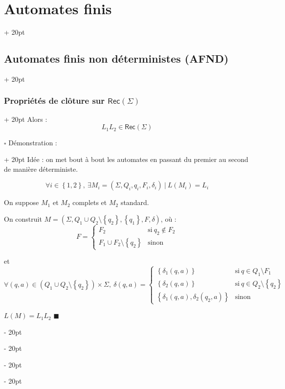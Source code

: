 \documentclass[a4paper, 12pt, twoside]{article}
\newcommand{\lr}[1]{\left( #1 \right)}
\newcommand{\set}[1]{\left\{ #1 \right\}}
\newcommand{\ind}[1][20pt]{\advance\leftskip + #1}
\newcommand{\deind}[1][20pt]{\advance\leftskip - #1}
\newenvironment{indt}[2][20pt]{#2 \par \ind[#1]}{\par \deind} %
\newenvironment{proof}[1][{Démonstration :}]{\begin{indt}{$\square$ #1}}{$\blacksquare$ \end{indt}}
\newcommand{\Rec}[1]{\mathsf{Rec}\!\lr{#1}}
\begin{document}
\begin{indt}{\section{Automates finis}}
\begin{indt}{\subsection{Automates finis non déterministes (AFND)}}
\begin{indt}{\subsubsection{Propriétés de clôture sur $\Rec \Sigma$}}
                Alors :
                \[
                    L_1 L_2 \in \Rec \Sigma
                \]

                \begin{proof}
                    Idée : on met bout à bout les automates en passant du premier au second de manière déterministe.

                    \[
                        \forall i \in \set{1, 2},\ \exists M_i = (\Sigma, Q_i, q_i, F_i, \delta_i)\ |\ L(M_i) = L_i
                    \]

                    On suppose $M_1$ et $M_2$ complets et $M_2$ standard.

                    On construit $M = \lr{\Sigma, Q_1 \cup Q_2 \setminus \set{q_2}, \set{q_1}, F, \delta}$, où :
                    \[
                        F =
                        \begin{cases}
                            F_2
                            & \text{si}\ q_2 \notin F_2
                            \\
                            F_1 \cup F_2 \setminus \set{q_2}
                            & \text{sinon}
                        \end{cases}
                    \]

                    et
                    \[
                        \forall (q, a) \in \lr{Q_1 \cup Q_2 \setminus \set{q_2}} \times \Sigma,\
                        \delta(q, a) =
                        \begin{cases}
                            \set{\delta_1(q, a)}
                            & \text{si}\ q \in Q_1 \setminus F_1
                            \\
                            \set{\delta_2(q, a)}
                            & \text{si}\ q \in Q_2 \setminus \set{q_2}
                            \\
                            \set{\delta_1(q, a), \delta_2(q_2, a)}
                            & \text{sinon}
                        \end{cases}
                    \]

                     $L(M) = L_1 L_2$
                \end{proof}
            \end{indt}
        \end{indt}
    \end{indt}
    
\end{document}
